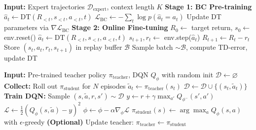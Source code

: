 \documentclass[11pt,a4paper]{article}
\theoremstyle{definition}
\begin{document}
\begin{algorithm}[ht]
\caption{DecisionTransformer: offline-to-online transfer}
\label{alg:dt}
\begin{algorithmic}[1]
\State \textbf{Input:} Expert trajectories $\mathcal{D}_{\text{expert}}$, context length $K$
\State \textbf{Stage 1: BC Pre-training}
        \State $\hat{a}_t \gets \text{DT}(R_{<t}, s_{<t}, a_{<t}, t)$ 
        \State $\mathcal{L}_{\text{BC}} \gets -\sum_t \log p(\hat{a}_t = a_t)$
        \State Update DT parameters via $\nabla\mathcal{L}_{\text{BC}}$
    \EndFor
\EndFor
\State \textbf{Stage 2: Online Fine-tuning}
    \State $R_0 \gets$ target return, $s_0 \gets$ env.reset()
        \State $\hat{a}_t \gets \text{DT}(R_{<t}, s_{<t}, a_{<t}, t)$
        \State $s_{t+1}, r_t \gets$ env.step($\hat{a}_t$)
        \State $R_{t+1} \gets R_t - r_t$ 
        \State Store $(s_t, a_t, r_t, s_{t+1})$ in replay buffer $\mathcal{B}$
        \State Sample batch $\sim \mathcal{B}$, compute TD-error, update DT
    \EndFor
\EndFor
\end{algorithmic}
\end{algorithm}

\begin{algorithm}[ht]
\caption{DAgger+DQN: online imitation with value-based correction}
\label{alg:dagger}
\begin{algorithmic}[1]
\State \textbf{Input:} Pre-trained teacher policy $\pi_{\text{teacher}}$, DQN $Q_\phi$ with random init
\State $\mathcal{D} \gets \varnothing$
    \State \textbf{Collect:} Roll out $\pi_{\text{student}}$ for $N$ episodes
        \State $\tilde{a}_t \gets \pi_{\text{teacher}}(s_t)$ 
        \State $\mathcal{D} \gets \mathcal{D} \cup \{(s_t, \tilde{a}_t)\}$
    \EndFor
    \State \textbf{Train DQN:}
        \State Sample $(s, \tilde{a}, r, s') \sim \mathcal{D}$
        \State $y \gets r + \gamma \max_{a'} Q_{\phi^-}(s', a')$ 
        \State $\mathcal{L} \gets \frac{1}{2}(Q_\phi(s, \tilde{a}) - y)^2$ 
        \State $\phi \gets \phi - \alpha \nabla_\phi \mathcal{L}$
    \EndFor
    \State $\pi_{\text{student}}(s) \gets \arg\max_a Q_\phi(s, a)$ with $\epsilon$-greedy
    \State \textbf{(Optional)} Update teacher: $\pi_{\text{teacher}} \gets \pi_{\text{student}}$
\EndFor
\end{algorithmic}
\end{algorithm}
\end{document}
